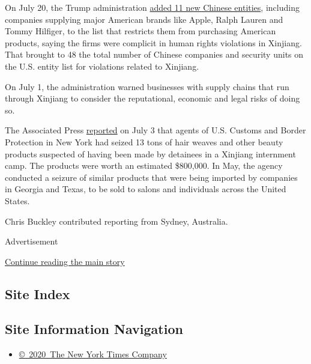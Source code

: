 On July 20, the Trump administration
\href{https://www.nytimes3xbfgragh.onion/2020/07/20/business/economy/china-sanctions-uighurs-labor.html}{added
11 new Chinese entities}, including companies supplying major American
brands like Apple, Ralph Lauren and Tommy Hilfiger, to the list that
restricts them from purchasing American products, saying the firms were
complicit in human rights violations in Xinjiang. That brought to 48 the
total number of Chinese companies and security units on the U.S. entity
list for violations related to Xinjiang.

On July 1, the administration warned businesses with supply chains that
run through Xinjiang to consider the reputational, economic and legal
risks of doing so.

The Associated Press
\href{https://apnews.com/fff5fc7925f09916bf6b9d5f79bb4132}{reported} on
July 3 that agents of U.S. Customs and Border Protection in New York had
seized 13 tons of hair weaves and other beauty products suspected of
having been made by detainees in a Xinjiang internment camp. The
products were worth an estimated \$800,000. In May, the agency conducted
a seizure of similar products that were being imported by companies in
Georgia and Texas, to be sold to salons and individuals across the
United States.

Chris Buckley contributed reporting from Sydney, Australia.

Advertisement

\protect\hyperlink{after-bottom}{Continue reading the main story}

\hypertarget{site-index}{%
\subsection{Site Index}\label{site-index}}

\hypertarget{site-information-navigation}{%
\subsection{Site Information
Navigation}\label{site-information-navigation}}

\begin{itemize}
\tightlist
\item
  \href{https://help.nytimes3xbfgragh.onion/hc/en-us/articles/115014792127-Copyright-notice}{©~2020~The
  New York Times Company}
\end{itemize}

